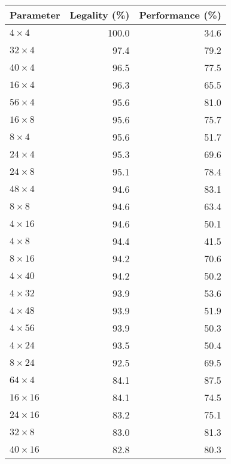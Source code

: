 \begin{tabular}{lrr}
\toprule
      Parameter &  Legality (\%) &  Performance (\%) \\
\midrule
   $4 \times 4$ &          100.0 &              34.6 \\
  $32 \times 4$ &           97.4 &              79.2 \\
  $40 \times 4$ &           96.5 &              77.5 \\
  $16 \times 4$ &           96.3 &              65.5 \\
  $56 \times 4$ &           95.6 &              81.0 \\
  $16 \times 8$ &           95.6 &              75.7 \\
   $8 \times 4$ &           95.6 &              51.7 \\
  $24 \times 4$ &           95.3 &              69.6 \\
  $24 \times 8$ &           95.1 &              78.4 \\
  $48 \times 4$ &           94.6 &              83.1 \\
   $8 \times 8$ &           94.6 &              63.4 \\
  $4 \times 16$ &           94.6 &              50.1 \\
   $4 \times 8$ &           94.4 &              41.5 \\
  $8 \times 16$ &           94.2 &              70.6 \\
  $4 \times 40$ &           94.2 &              50.2 \\
  $4 \times 32$ &           93.9 &              53.6 \\
  $4 \times 48$ &           93.9 &              51.9 \\
  $4 \times 56$ &           93.9 &              50.3 \\
  $4 \times 24$ &           93.5 &              50.4 \\
  $8 \times 24$ &           92.5 &              69.5 \\
  $64 \times 4$ &           84.1 &              87.5 \\
 $16 \times 16$ &           84.1 &              74.5 \\
 $24 \times 16$ &           83.2 &              75.1 \\
  $32 \times 8$ &           83.0 &              81.3 \\
 $40 \times 16$ &           82.8 &              80.3 \\
\bottomrule
\end{tabular}

